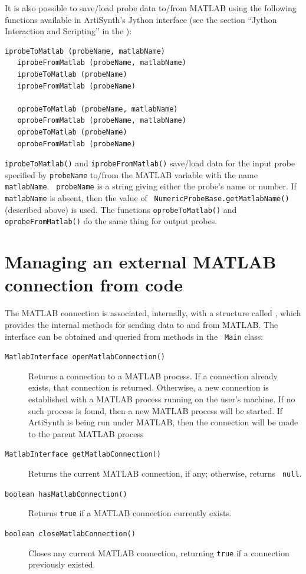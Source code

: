 \documentclass{article}
\begin{document}
It is also possible to save/load probe data to/from MATLAB using the
following functions available in ArtiSynth's Jython interface (see the
section ``Jython Interaction and Scripting'' in the
):
%
\begin{lstlisting}[]
   iprobeToMatlab (probeName, matlabName)
   iprobeFromMatlab (probeName, matlabName)
   iprobeToMatlab (probeName)
   iprobeFromMatlab (probeName)

   oprobeToMatlab (probeName, matlabName)
   oprobeFromMatlab (probeName, matlabName)
   oprobeToMatlab (probeName)
   oprobeFromMatlab (probeName)
\end{lstlisting}
%
{\tt iprobeToMatlab()} and {\tt iprobeFromMatlab()}
save/load data for the input probe specified by {\tt probeName}
to/from the MATLAB variable with the name {\tt matlabName}. {\tt
probeName} is a string giving either the probe's name or number.  If
{\tt matlabName} is absent, then the value of {\tt
NumericProbeBase.getMatlabName()} (described above) is used.  The
functions {\tt oprobeToMatlab()} and {\tt oprobeFromMatlab()} do the
same thing for output probes.

\section{Managing an external MATLAB connection from code}
\label{MatlabFromCode:sec}

The MATLAB connection is associated, internally, with a structure
called , which
provides the internal methods for sending data to and from MATLAB.
The interface can be obtained and queried from methods in the {\tt
Main} class:

\begin{description}

\item[{\tt MatlabInterface openMatlabConnection()}] \mbox{}

Returns a connection to a MATLAB process. If a connection already
exists, that connection is returned. Otherwise, a new connection is
established with a MATLAB process running on the user's machine.  If
no such process is found, then a new MATLAB process will be
started. If ArtiSynth is being run under MATLAB, then the connection
will be made to the parent MATLAB process

\item[{\tt MatlabInterface getMatlabConnection()}] \mbox{}

Returns the current MATLAB connection, if any; otherwise, returns {\tt
null}.

\item[{\tt boolean hasMatlabConnection()}] \mbox{}

Returns {\tt true} if a MATLAB connection currently exists.

\item[{\tt boolean closeMatlabConnection()}] \mbox{}

Closes any current MATLAB connection, returning {\tt true} if a
connection previously existed.

\end{description}
\end{document}
